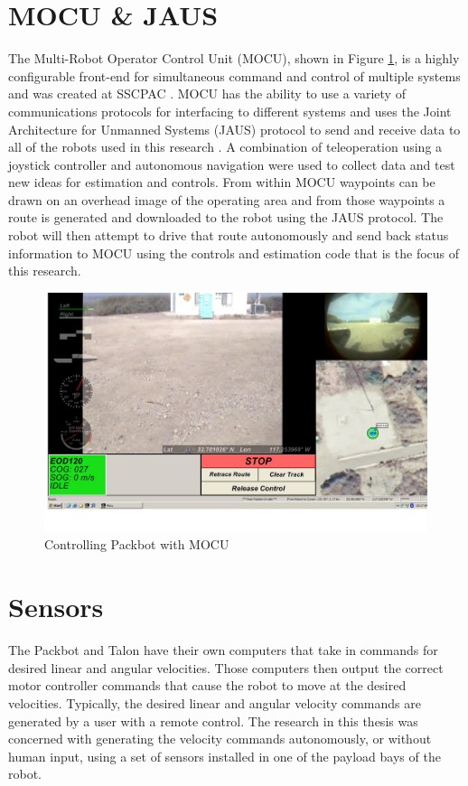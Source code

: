\section{MOCU \& JAUS}
\label{sec:mocujaus}
The Multi-Robot Operator Control Unit (MOCU), shown in Figure \ref{fig:mocu}, is a highly configurable front-end for simultaneous command and control of multiple systems and was created at SSCPAC \cite{PowellMOCU08}. MOCU has the ability to use a variety of communications protocols for interfacing to different systems and uses the Joint Architecture for Unmanned Systems (JAUS) protocol to send and receive data to all of the robots used in this research \cite{RoweJAUS08}. A combination of teleoperation using a joystick controller and autonomous navigation were used to collect data and test new ideas for estimation and controls. From within MOCU waypoints can be drawn on an overhead image of the operating area and from those waypoints a route is generated and downloaded to the robot using the JAUS protocol. The robot will then attempt to drive that route autonomously and send back status information to MOCU using the controls and estimation code that is the focus of this research.

\begin{figure}[ht!]
	\centering
	\includegraphics[width=.75\textwidth]{images/mocuPackbotScreenshot}
	\caption{Controlling Packbot with MOCU}
	\label{fig:mocu}
\end{figure}

\section{Sensors}
\label{sec:bgSensors}
The Packbot and Talon have their own computers that take in commands for desired linear and angular velocities. Those computers then output the correct motor controller commands that cause the robot to move at the desired velocities. Typically, the desired linear and angular velocity commands are generated by a user with a remote control. The research in this thesis was concerned with generating the velocity commands autonomously, or without human input, using a set of sensors installed in one of the payload bays of the robot.

